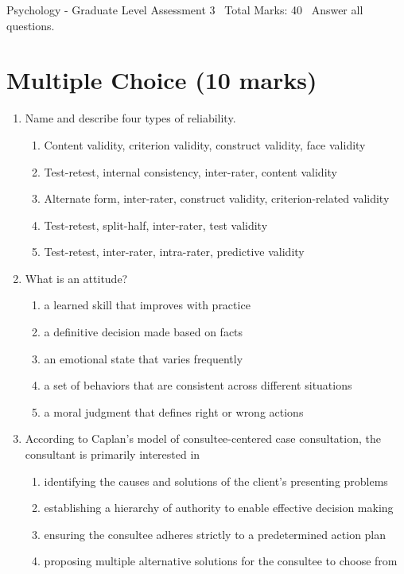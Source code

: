 \documentclass[12pt]{article}
\begin{document}
\begin{center}
Psychology - Graduate Level Assessment 3 \
Total Marks: 40 \
Answer all questions.
\end{center}

\section*{Multiple Choice (10 marks)}
\begin{enumerate}[label=\arabic*.]
\item Name and describe four types of reliability.
\begin{enumerate}[label=(\alph*)]
    \item Content validity, criterion validity, construct validity, face validity
    \item Test-retest, internal consistency, inter-rater, content validity
    \item Alternate form, inter-rater, construct validity, criterion-related validity
    \item Test-retest, split-half, inter-rater, test validity
    \item Test-retest, inter-rater, intra-rater, predictive validity
\end{enumerate}
\item What is an attitude?
\begin{enumerate}[label=(\alph*)]
    \item a learned skill that improves with practice
    \item a definitive decision made based on facts
    \item an emotional state that varies frequently
    \item a set of behaviors that are consistent across different situations
    \item a moral judgment that defines right or wrong actions
\end{enumerate}
\item According to Caplan's model of consultee-centered case consultation, the consultant is primarily interested in
\begin{enumerate}[label=(\alph*)]
    \item identifying the causes and solutions of the client's presenting problems
    \item establishing a hierarchy of authority to enable effective decision making
    \item ensuring the consultee adheres strictly to a predetermined action plan
    \item proposing multiple alternative solutions for the consultee to choose from

\end{enumerate}
\end{enumerate}
\end{document}
